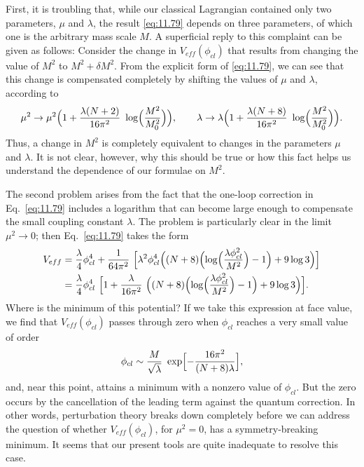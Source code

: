 First, it is troubling that, while our classical Lagrangian contained only
two parameters, $\mu$ and $\lambda$, the result \eqref{eq:11.79} depends on
three parameters, of which one is the arbitrary mass scale $M$.  A superficial
reply to this complaint can be given as follows: Consider the change in
$V_{eff}(\phi_{cl})$ that results from changing the value of $M^2$ to
$M^2 + \delta M^2$.  From the explicit form of \eqref{eq:11.79}, we can see
that this change is compensated completely by shifting the values of $\mu$ and
$\lambda$, according to
\begin{equation}
  \mu^2 \to \mu^2\Bigl( 1 + \frac{\lambda(N+2)}{16\pi^2}\ \log\Bigl(
    \frac{M^2}{M_0^2} \Bigr) \Bigr),\qquad
  \lambda \to \lambda\Bigl( 1 + \frac{\lambda(N+8)}{16\pi^2}\ \log\Bigl(
    \frac{M^2}{M_0^2} \Bigr) \Bigr) .
  \label{eq:11.80}
\end{equation}
Thus, a change in $M^2$ is completely equivalent to changes in the parameters
$\mu$ and $\lambda$.  It is not clear, however, why this should be true or how
this fact helps us understand the dependence of our formulae on $M^2$.

The second problem arises from the fact that the one-loop correction in
Eq.~\eqref{eq:11.79} includes a logarithm that can become large enough to
compensate the small coupling constant $\lambda$.  The problem is particularly
clear in the limit $\mu^2\to 0$; then Eq.~\eqref{eq:11.79} takes the form
\begin{equation}
  \begin{aligned}
    V_{eff} &= \frac{\lambda}{4}\phi_{cl}^4 + \frac{1}{64\pi^2}\ \Bigl[
      \lambda^2\phi_{cl}^4\Bigl( (N+8)\Bigl( \log\Bigl(
        \frac{\lambda\phi_{cl}^2}{M^2} \Bigr) - 1 \Bigr) + 9\log 3 \Bigr)
      \Bigr]\\
    &= \frac{\lambda}{4}\phi_{cl}^4\ \Bigl[ 1 + \frac{\lambda}{16\pi^2}\ \Bigl(
      (N+8)\Bigl( \log\Bigl( \frac{\lambda\phi_{cl}^2}{M^2} \Bigr)
        - 1 \Bigr) + 9\log 3 \Bigr) \Bigr] .
  \end{aligned}
  \label{eq:11.81}
\end{equation}
Where is the minimum of this potential?  If we take this expression at face
value, we find that $V_{eff}(\phi_{cl})$ passes through zero when $\phi_{cl}$
reaches a very small value of order
\begin{equation}
  \phi_{cl} \sim \frac{M}{\sqrt{\lambda}}\ \exp\Bigl[ -\frac{16\pi^2}
    {(N+8)\lambda} \Bigr] ,
\end{equation}
and, near this point, attains a minimum with a nonzero value of $\phi_{cl}$.
But the zero occurs by the cancellation of the leading term against the
quantum correction.  In other words, perturbation theory breaks down
completely before we can address the question of whether $V_{eff}(\phi_{cl})$,
for $\mu^2 = 0$, has a symmetry-breaking minimum.  It seems that our present
tools are quite inadequate to resolve this case.

